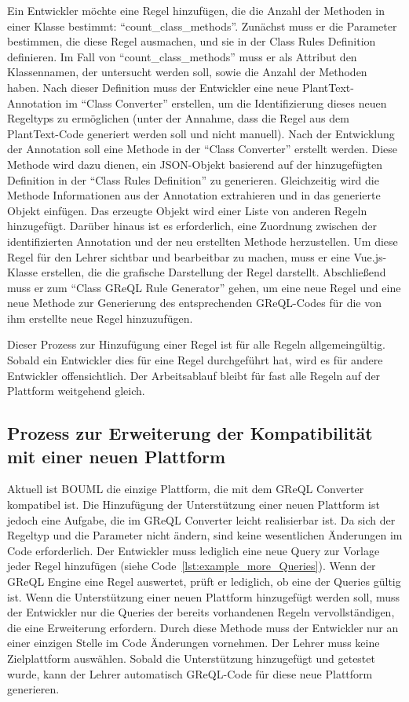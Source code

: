 Ein Entwickler möchte eine Regel hinzufügen, die die Anzahl der Methoden in einer Klasse bestimmt: ``count\_class\_methods''.
Zunächst muss er die Parameter bestimmen, die diese Regel ausmachen, und sie in der Class Rules Definition definieren.
Im Fall von ``count\_class\_methods'' muss er als Attribut den Klassennamen, der untersucht werden soll, sowie die
Anzahl der Methoden haben. Nach dieser Definition muss der Entwickler eine neue PlantText-Annotation im ``Class Converter''
erstellen, um die Identifizierung dieses neuen Regeltyps zu ermöglichen (unter der Annahme, dass die Regel
aus dem PlantText-Code generiert werden soll und nicht manuell). Nach der Entwicklung der Annotation soll eine Methode
in der ``Class Converter'' erstellt werden. Diese Methode wird dazu dienen, ein JSON-Objekt basierend auf der
hinzugefügten Definition in der ``Class Rules Definition'' zu generieren. Gleichzeitig wird die Methode Informationen
aus der Annotation extrahieren und in das generierte Objekt einfügen. Das erzeugte Objekt wird einer Liste von anderen
Regeln hinzugefügt. Darüber hinaus ist es erforderlich, eine Zuordnung zwischen der identifizierten Annotation und der
neu erstellten Methode herzustellen. Um diese Regel für den Lehrer sichtbar und bearbeitbar zu machen, muss er
eine Vue.js-Klasse erstellen, die die grafische Darstellung der Regel darstellt. Abschließend muss er zum ``Class GReQL
Rule Generator'' gehen, um eine neue Regel und eine neue Methode zur Generierung des entsprechenden GReQL-Codes für die
von ihm erstellte neue Regel hinzuzufügen.

Dieser Prozess zur Hinzufügung einer Regel ist für alle Regeln allgemeingültig. Sobald ein Entwickler dies für eine
Regel durchgeführt hat, wird es für andere Entwickler offensichtlich. Der Arbeitsablauf bleibt für fast alle Regeln auf
der Plattform weitgehend gleich.


\subsection{Prozess zur Erweiterung der Kompatibilität mit einer neuen Plattform}

Aktuell ist BOUML die einzige Plattform, die mit dem GReQL Converter kompatibel ist. Die Hinzufügung der Unterstützung
einer neuen Plattform ist jedoch eine Aufgabe, die im GReQL Converter leicht realisierbar ist. Da sich der Regeltyp und
die Parameter nicht ändern, sind keine wesentlichen Änderungen im Code erforderlich. Der Entwickler muss lediglich eine
neue Query zur Vorlage jeder Regel hinzufügen (siehe Code~\ref{lst:example_more_Queries}). Wenn der GReQL Engine eine
Regel auswertet, prüft er lediglich, ob eine der Queries gültig ist. Wenn die Unterstützung einer neuen Plattform
hinzugefügt werden soll, muss der Entwickler nur die Queries der bereits vorhandenen Regeln vervollständigen, die eine
Erweiterung erfordern. Durch diese Methode muss der Entwickler nur an einer einzigen Stelle im Code Änderungen
vornehmen. Der Lehrer muss keine Zielplattform auswählen. Sobald die Unterstützung hinzugefügt und getestet wurde,
kann der Lehrer automatisch GReQL-Code für diese neue Plattform generieren.

